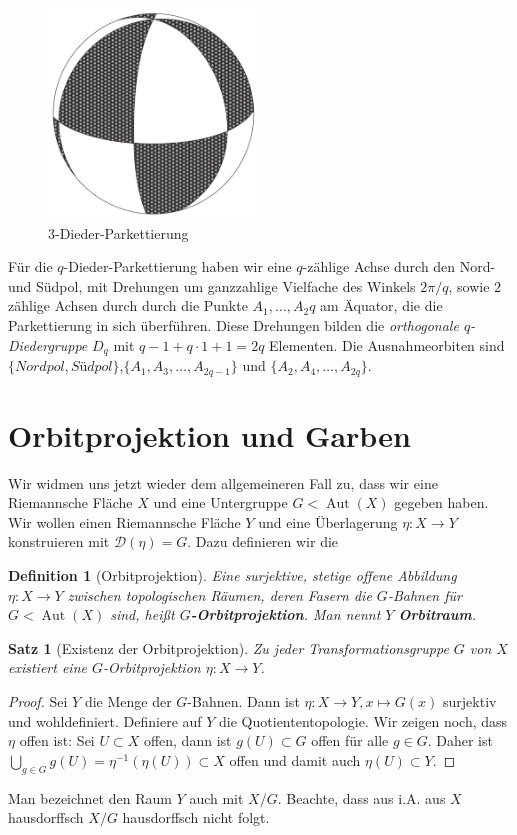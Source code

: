 \documentclass[12pt,a4paper]{article}
\theoremstyle{plain}
\newtheorem{Satz}[Theorem]{Satz}
\newtheorem{Definition}[Theorem]{Definition}
\newcommand{\herv}[1]{{\emph{\textbf{#1}}}}
\numberwithin{equation}{section}
\begin{document}
\begin{figure} \includegraphics[width=0.5\textwidth]{Dieder.png}
\caption{$3$-Dieder-Parkettierung}
\end{figure}\noindent Für die $q$-Dieder-Parkettierung haben wir eine $q$-zählige Achse durch den Nord- und Südpol, mit Drehungen um ganzzahlige Vielfache des Winkels $2\pi/q$, sowie $2$ zählige Achsen durch durch die Punkte $A_1,\ldots,A_2q$ am Äquator, die die Parkettierung in sich überführen. Diese Drehungen bilden die \emph{orthogonale $q$-Diedergruppe} $D_q$ mit $q-1+q\cdot 1+1=2q$ Elementen. Die Ausnahmeorbiten sind \linebreak $\{\textit{Nordpol}, \textit{Südpol}\}$,$\{A_1,A_3,\ldots,A_{2q-1}\}$ \linebreak und $\{A_2,A_4,\ldots,A_{2q}\}$.

\section{Orbitprojektion und Garben}
Wir widmen uns jetzt wieder dem allgemeineren Fall zu, dass wir eine Riemannsche Fläche $X$ und eine Untergruppe $G < \operatorname{Aut}(X)$ gegeben haben. Wir wollen einen Riemannsche Fläche $Y$ und eine Überlagerung $\eta: X\rightarrow Y$ konstruieren mit $\mathcal{D}(\eta) = G$. Dazu definieren wir die
\begin{Definition}[Orbitprojektion] Eine surjektive, stetige offene Abbildung $\eta:X\rightarrow Y$ zwischen topologischen Räumen, deren Fasern die $G$-Bahnen für $G < \operatorname{Aut}(X)$ sind, heißt \herv{$G$-Orbitprojektion}. Man nennt $Y$ \herv{Orbitraum}.
\end{Definition}

\begin{Satz}[Existenz der Orbitprojektion] Zu jeder Transformationsgruppe $G$ von $X$ existiert eine $G$-Orbitprojektion $\eta:X\rightarrow Y$.
\end{Satz}
\begin{proof}
Sei $Y$ die Menge der $G$-Bahnen. Dann ist $\eta: X\rightarrow Y, x\mapsto G(x)$ surjektiv und wohldefiniert. Definiere auf $Y$ die Quotiententopologie. Wir zeigen noch, dass $\eta$ offen ist: Sei  $U\subset X$ offen, dann ist $g(U)\subset G$ offen für alle $g\in G$. Daher ist $\bigcup_{g\in G} g(U) = \eta^{-1}(\eta(U))\subset X$ offen und damit auch $\eta(U)\subset Y$.
\end{proof}
Man bezeichnet den Raum $Y$ auch mit $X/G$. Beachte, dass aus i.A. aus $X$ hausdorffsch $X/G$ hausdorffsch nicht folgt.
\end{document}
